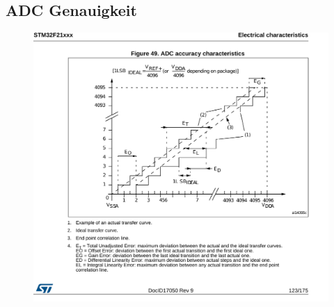 \begin{appendices}
	\newpage
	\section{ADC Genauigkeit}\label{sec:stm32f21xx-adc}
	\begin{figure}[h!]
		\centering
		\includegraphics[width=1\textwidth]{stm32f21xx-adc.pdf}
	\end{figure}

	\newpage

\end{appendices}
